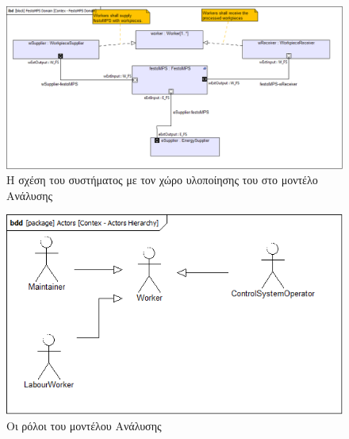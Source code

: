 \documentclass[a4paper,12pt,twoside]{report}
\begin{document}
\begin{appendices}
				\begin{figure}[hp]
					\centering
					\includegraphics[scale=0.30]{AnalysisModel_Contex-FestoMPSDomain.png}
					\caption{Η σχέση του συστήματος με τον χώρο υλοποίησης του στο μοντέλο Ανάλυσης}
					\label{φωτ:Η σχέση του συστήματος με τον χώρο υλοποίησης του στο μοντέλο Ανάλυσης}
				\end{figure}
				
				\begin{figure}[hp]
					\centering
					\includegraphics[scale=0.50]{AnalysisModel_Contex-ActorsHierarchy.png}
					\caption{Οι ρόλοι του μοντέλου Ανάλυσης}
					\label{φωτ:Οι ρόλοι του μοντέλου Ανάλυσης}
				\end{figure}
				

\end{appendices}
\end{document}
